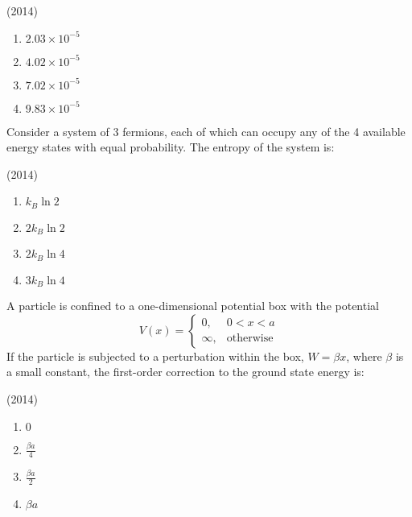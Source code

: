     \hfill{(2014)}
    
	\begin{multicols}{4}
		\begin{enumerate}
                \item $2.03\times10^{-5}$
                \item $4.02\times10^{-5}$
                \item $7.02\times10^{-5}$
                \item $9.83\times10^{-5}$
			\end{enumerate}
		\end{multicols}

    \item Consider a system of 3 fermions, each of which can occupy any of the 4 available energy states with equal probability. The entropy of the system is:
    
    \hfill{(2014)}
    
    \begin{multicols}{4}
    \begin{enumerate}
        \item $k_B \ln 2$
        \item $2 k_B \ln 2$
        \item $2 k_B \ln 4$
        \item $3 k_B \ln 4$
    \end{enumerate}
    \end{multicols}

    \item A particle is confined to a one-dimensional potential box with the potential
    \[
    V(x) = 
    \begin{cases}
        0, & 0 < x < a \\
        \infty, & \text{otherwise}
    \end{cases}
    \]
    If the particle is subjected to a perturbation within the box, $W = \beta x$, where $\beta$ is a small constant, the first-order correction to the ground state energy is:
    
    \hfill{(2014)}
    
    \begin{multicols}{2}
    \begin{enumerate}
        \item $0$
        \item $\frac{\beta a}{4}$
        \item $\frac{\beta a}{2}$
        \item $\beta a$
    \end{enumerate}
    \end{multicols}

